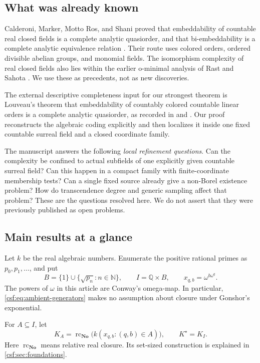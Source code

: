 \documentclass[11pt,a4paper]{article}
\numberwithin{equation}{section}
\theoremstyle{definition}
\theoremstyle{remark}
\newcommand{\N}{\mathbb N}
\newcommand{\Q}{\mathbb Q}
\newcommand{\No}{\mathbf{No}}
\newcommand{\rc}{\operatorname{rc}}
\newcommand{\Kstar}{K^{\star}}
\begin{document}
\subsection{What was already known}

Calderoni, Marker, Motto Ros, and Shani proved that embeddability of countable
real closed fields is a complete analytic quasiorder, and that
bi-embeddability is a complete analytic equivalence relation
\cite[Corollary 7.3]{cmms}. Their route uses colored orders, ordered divisible
abelian groups, and monomial fields. The isomorphism complexity of
real closed fields also lies within the earlier o-minimal analysis of Rast
and Sahota \cite{rast}. We use these as precedents, not as new discoveries.

The external descriptive completeness input for our strongest theorem is
Louveau's theorem that embeddability of countably colored countable linear
orders is a complete analytic quasiorder, as recorded in
\cite[Theorem 7.1]{cmms} and \cite[Theorem 3.2]{marcone}.
Our proof reconstructs the algebraic coding explicitly and then localizes it
inside one fixed countable surreal field and a closed coordinate family.

The manuscript answers the following \emph{local refinement questions}.
Can the complexity be confined to actual subfields of one explicitly given
countable surreal field? Can this happen in a compact family with
finite-coordinate membership tests? Can a single fixed source already give
a non-Borel existence problem? How do transcendence degree and generic
sampling affect that problem? These are the questions resolved here. We do
not assert that they were previously published as open problems.

\subsection{Main results at a glance}

Let $k$ be the real algebraic numbers. Enumerate the positive rational primes
as $p_0,p_1,\ldots$, and put
\begin{equation}
 B=\{1\}\cup\{\sqrt{p_n}:n\in\N\},\qquad I=\Q\times B,
 \qquad x_{q,b}=\omega^{b\omega^q}.
 \label{csf:eq:ambient-generators}
\end{equation}
The powers of $\omega$ in this article are Conway's omega-map. In particular,
\eqref{csf:eq:ambient-generators} makes no assumption about closure under
Gonshor's exponential.

For $A\subseteq I$, let
\begin{equation}
 K_A=\rc_{\No}\bigl(k(x_{q,b}:(q,b)\in A)\bigr),
 \qquad \Kstar=K_I.
 \label{csf:eq:ambient}
\end{equation}
Here $\rc_{\No}$ means relative real closure. Its set-sized construction is
explained in \cref{csf:sec:foundations}.
\end{document}
